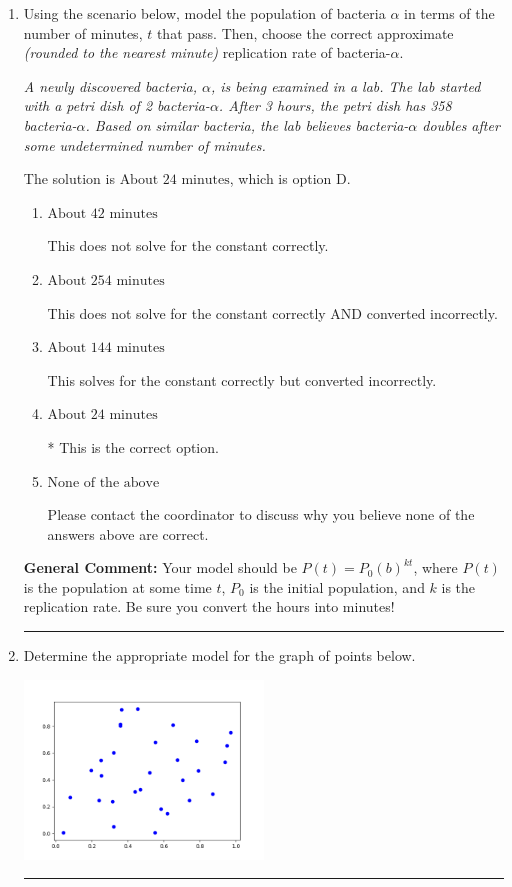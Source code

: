 \documentclass{extbook}[14pt]
\newcommand{\litem}[1]{\item #1

\rule{\textwidth}{0.4pt}}
\begin{document}
\begin{enumerate}\litem{
Using the scenario below, model the population of bacteria $\alpha$ in terms of the number of minutes, $t$ that pass. Then, choose the correct approximate \textit{(rounded to the nearest minute)} replication rate of bacteria-$\alpha$.

\begin{center}
    \textit{ A newly discovered bacteria, $\alpha$, is being examined in a lab. The lab started with a petri dish of 2 bacteria-$\alpha$. After 3 hours, the petri dish has 358 bacteria-$\alpha$. Based on similar bacteria, the lab believes bacteria-$\alpha$ doubles after some undetermined number of minutes. }
\end{center}
The solution is \( \text{About } 24 \text{ minutes} \), which is option D.\begin{enumerate}[label=\Alph*.]
\item \( \text{About } 42 \text{ minutes} \)

This does not solve for the constant correctly.
\item \( \text{About } 254 \text{ minutes} \)

This does not solve for the constant correctly AND converted incorrectly.
\item \( \text{About } 144 \text{ minutes} \)

This solves for the constant correctly but converted incorrectly.
\item \( \text{About } 24 \text{ minutes} \)

* This is the correct option.
\item \( \text{None of the above} \)

Please contact the coordinator to discuss why you believe none of the answers above are correct.
\end{enumerate}

\textbf{General Comment:} Your model should be $P(t) = P_0(b)^{kt}$, where $P(t)$ is the population at some time $t$, $P_0$ is the initial population, and $k$ is the replication rate. Be sure you convert the hours into minutes!
}
\litem{
Determine the appropriate model for the graph of points below.

\begin{center}
    \includegraphics[width=0.5\textwidth]{../Figures/identifyModelGraph11A.png}
\end{center}


}
\end{enumerate}
\end{document}

